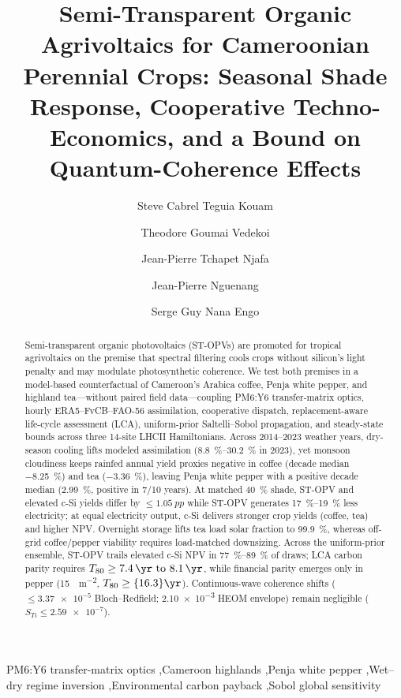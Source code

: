 \documentclass[preprint,12pt,a4paper]{elsarticle}
\begin{document}
\begin{frontmatter}

\title{Semi-Transparent Organic Agrivoltaics for Cameroonian Perennial Crops: Seasonal Shade Response, Cooperative Techno-Economics, and a Bound on Quantum-Coherence Effects}

\author[udla]{Steve Cabrel Teguia Kouam}
\author[uy1]{Theodore Goumai Vedekoi}
\author[uy1]{Jean-Pierre Tchapet Njafa}
\author[udla]{Jean-Pierre Nguenang}
\author[uy1]{Serge Guy Nana Engo}

\address[udla]{Department of Physics, Faculty of Science, University of Douala, P.O. Box 24157, Douala, Cameroon}
\address[uy1]{Department of Physics, Faculty of Science, University of Yaound\'e~I, P.O. Box 812, Yaound\'e, Cameroon}

\begin{abstract}
Semi-transparent organic photovoltaics (ST-OPVs) are promoted for tropical agrivoltaics on the premise that spectral filtering cools crops without silicon's light penalty and may modulate photosynthetic coherence. We test both premises in a model-based counterfactual of Cameroon's Arabica coffee, Penja white pepper, and highland tea---without paired field data---coupling PM6:Y6 transfer-matrix optics, hourly ERA5--FvCB--FAO-56 assimilation, cooperative dispatch, replacement-aware life-cycle assessment (LCA), uniform-prior Saltelli--Sobol propagation, and steady-state bounds across three 14-site LHCII Hamiltonians. Across 2014--2023 weather years, dry-season cooling lifts modeled assimilation (\qtyrange{+8.8}{+30.2}{\percent} in 2023), yet monsoon cloudiness keeps rainfed annual yield proxies negative in coffee (decade median \qty{-8.25}{\percent}) and tea (\qty{-3.36}{\percent}), leaving Penja white pepper with a positive decade median (\qty{+2.99}{\percent}, positive in 7/10 years). At matched \qty{40}{\percent} shade, ST-OPV and elevated c-Si yields differ by $\le \qty{1.05}{pp}$ while ST-OPV generates \qtyrange{17}{19}{\percent} less electricity; at equal electricity output, c-Si delivers stronger crop yields (coffee, tea) and higher NPV. Overnight storage lifts tea load solar fraction to \qty{99.9}{\percent}, whereas off-grid coffee/pepper viability requires load-matched downsizing. Across the uniform-prior ensemble, ST-OPV trails elevated c-Si NPV in \qtyrange{77}{89}{\percent} of draws; LCA carbon parity requires $T_{80}\ge \qtyrange{7.4}{8.1}{\yr}$, while financial parity emerges only in pepper (\qty{15}{\USD\per\square\meter}, $T_{80}\ge \qty{16.3}{\yr}$). Continuous-wave coherence shifts ($\le \num{3.37e-5}$ Bloch--Redfield; \num{2.10e-3} HEOM envelope) remain negligible ($S_{Ti}\le \num{2.59e-7}$).
\end{abstract}

\begin{keyword}
PM6:Y6 transfer-matrix optics \sep Cameroon highlands \sep Penja white pepper \sep Wet--dry regime inversion \sep Environmental carbon payback \sep Sobol global sensitivity
\end{keyword}

\end{frontmatter}
\linenumbers
\end{document}
